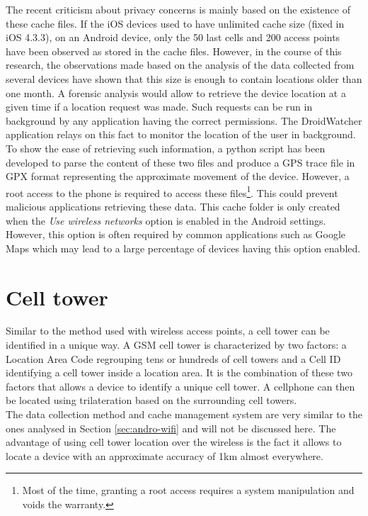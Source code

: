 The recent criticism about privacy concerns is mainly based on the existence of these cache files.
If the iOS devices used to have unlimited cache size (fixed in iOS 4.3.3), on an Android device, only the 50 last cells and 200 access points have been observed as stored in the cache files.
However, in the course of this research, the observations made based on the analysis of the data collected from several devices have shown that this size is enough to contain locations older than one month.
A forensic analysis would allow to retrieve the device location at a given time if a location request was made.
Such requests can be run in background by any application having the correct permissions.
The DroidWatcher application relays on this fact to monitor the location of the user in background.\\

To show the ease of retrieving such information, a python script has been developed\cite{soft-locdump} to parse the content of these two files and produce a GPS trace file in GPX format representing the approximate movement of the device.
However, a root access to the phone is required to access these files\footnote{Most of the time, granting a root access requires a system manipulation and voids the warranty.}.
This could prevent malicious applications retrieving these data.
This cache folder is only created when the \emph{Use wireless networks} option is enabled in the Android settings.
However, this option is often required by common applications such as Google Maps which may lead to a large percentage of devices having this option enabled.\\

\section{Cell tower}
Similar to the method used with wireless access points, a cell tower can be identified in a unique way.
A GSM cell tower is characterized by two factors: a Location Area Code regrouping tens or hundreds of cell towers and a Cell ID identifying a cell tower inside a location area.
It is the combination of these two factors that allows a device to identify a unique cell tower.
A cellphone can then be located using trilateration based on the surrounding cell towers.\\

The data collection method and cache management system are very similar to the ones analysed in Section \ref{sec:andro-wifi} and will not be discussed here.
The advantage of using cell tower location over the wireless is the fact it allows to locate a device with an approximate accuracy of 1km almost everywhere.

